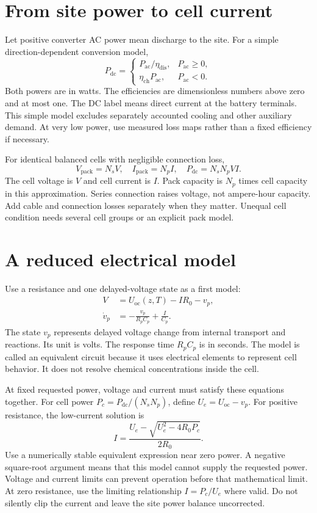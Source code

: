 \documentclass[11pt,a4paper]{report}
\begin{document}
\section{From site power to cell current}
Let positive converter AC power mean discharge to the site.
For a simple direction-dependent conversion model,
\begin{equation}
P_{\mathrm{dc}}=
\begin{cases}
P_{\mathrm{ac}}/\eta_{\mathrm{dis}},&P_{\mathrm{ac}}\geq0,\\
\eta_{\mathrm{ch}}P_{\mathrm{ac}},&P_{\mathrm{ac}}<0.
\end{cases}
\end{equation}
Both powers are in watts.
The efficiencies are dimensionless numbers above zero and at most one.
The DC label means direct current at the battery terminals.
This simple model excludes separately accounted cooling and other auxiliary demand.
At very low power, use measured loss maps rather than a fixed efficiency if necessary.

For identical balanced cells with negligible connection loss,
\begin{equation}
V_{\mathrm{pack}}=N_sV,\quad I_{\mathrm{pack}}=N_pI,\quad
P_{\mathrm{dc}}=N_sN_pVI.
\end{equation}
The cell voltage is $V$ and cell current is $I$.
Pack capacity is $N_p$ times cell capacity in this approximation.
Series connection raises voltage, not ampere-hour capacity.
Add cable and connection losses separately when they matter.
Unequal cell condition needs several cell groups or an explicit pack model.

\section{A reduced electrical model}
Use a resistance and one delayed-voltage state as a first model:
\begin{align}
V&=U_{\mathrm{oc}}(z,T)-IR_0-v_p,\\
\dot v_p&=-\frac{v_p}{R_pC_p}+\frac{I}{C_p}.
\label{eq:battery-electrical}
\end{align}
The state $v_p$ represents delayed voltage change from internal transport and reactions.
Its unit is volts.
The response time $R_pC_p$ is in seconds.
The model is called an equivalent circuit because it uses electrical elements to represent cell behavior.
It does not resolve chemical concentrations inside the cell.

At fixed requested power, voltage and current must satisfy these equations together.
For cell power $P_c=P_{\mathrm{dc}}/(N_sN_p)$, define $U_e=U_{\mathrm{oc}}-v_p$.
For positive resistance, the low-current solution is
\begin{equation}
I=\frac{U_e-\sqrt{U_e^2-4R_0P_c}}{2R_0}.
\end{equation}
Use a numerically stable equivalent expression near zero power.
A negative square-root argument means that this model cannot supply the requested power.
Voltage and current limits can prevent operation before that mathematical limit.
At zero resistance, use the limiting relationship $I=P_c/U_e$ where valid.
Do not silently clip the current and leave the site power balance uncorrected.
\end{document}
